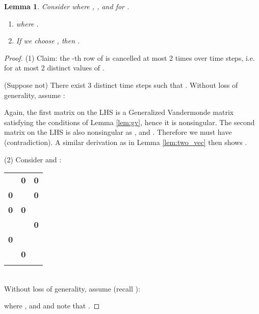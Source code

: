 \documentclass[journal]{IEEEtran}
\newtheorem{lem}{\bf{Lemma}}
\begin{document}
\begin{lem} \label{lem:three_vec} Consider  where , ,  and  for .   
\begin{enumerate}
\item 
 where .
\item  
If we choose ,  then .
\end{enumerate}
\end{lem}
\begin{proof} (1) Claim: the -th row of  is cancelled at most 2 times over  time steps, i.e. for at most 2 distinct values of . 
	
	(Suppose not) There exist 3 distinct time steps  such that . Without loss of generality, assume :
	
	
Again, the first matrix on the LHS is a Generalized Vandermonde matrix satisfying the conditions of Lemma \ref{lem:gv}, hence it is nonsingular. The second matrix on the LHS is also nonsingular as ,  and . Therefore we must have  (contradiction). A similar derivation as in Lemma \ref{lem:two_vec} then shows . 

(2) Consider  and :\\

\begin{tabular}[!b]{ccc} 
  \hline
   &    &   \\
  \hline
	 & {\bf 0 } & {\bf 0} \\
  {\bf 0}  &   & {\bf 0} \\
  {\bf 0} & {\bf 0} &   \\
  &   & {\bf 0 } \\
  {\bf 0} &   &     \\
  & {\bf 0} &     \\
 &    &  \\
  \hline
\end{tabular}\bigskip\\
\noindent Without loss of generality, assume  (recall ):

where
 ,  and  and note that .
\end{proof}
\end{document}
